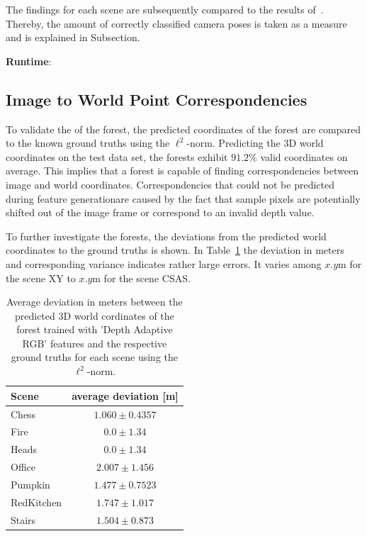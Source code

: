 \documentclass[final]{cvpr}
\begin{document}
The findings for each scene are subsequently compared
to the results of~\cite{shotton2013}. Thereby, the amount of correctly classified camera poses is taken as a measure 
and is explained in Subsection.

\textbf{Runtime}: 



\subsection{Image to World Point Correspondencies}
To validate the  of the forest, the predicted coordinates of the forest are compared to the known ground truths using 
the $\ell^2$-norm. Predicting the 3D world coordinates on the test data set, the forests exhibit
$91.2\%$ valid coordinates on average. This implies that a forest is capable of finding correspondencies between 
image and world coordinates. Correspondencies that could not be predicted during feature generationare caused by the 
fact that sample pixels are potentially shifted out of the image frame or correspond to an invalid depth value. 

To further investigate the forests, the deviations from the predicted world coordinates to the ground truths is shown. 
In Table~\ref{tab:forest-error} the deviation in meters and corresponding variance indicates rather large errors.
It varies among $x.y$m for the scene XY to $x.y$m for the scene CSAS.

\begin{table}[h]
	\begin{center}
	\begin{tabular}{|l|c|}
	\hline
	Scene & average deviation [m]\\
	\hline\hline
	Chess 		& 	$1.060 \pm 0.4357$ \\
	Fire 		& 	$0.0 \pm 1.34$	\\
	Heads 		& 	$0.0 \pm 1.34$	\\
	Office 		&   $2.007 \pm 1.456$ \\
	Pumpkin 	& 	$1.477 \pm 0.7523$ \\
	RedKitchen 	& 	$1.747 \pm 1.017$ \\
	Stairs 		& 	$1.504 \pm 0.873$ \\
	\hline
	\end{tabular}
	\end{center}
	\label{tab:forest-error}
	\caption{Average deviation in meters between the predicted 3D world cordinates of the forest trained with 
	'Depth Adaptive RGB' features and the respective ground truths for each scene using the $\ell^2$-norm.}
\end{table}
\end{document}
